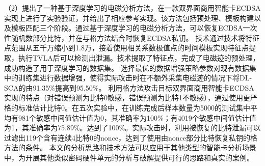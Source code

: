 {	
	（2）提出了一种基于深度学习的电磁分析方法，在一款双界面商用智能卡ECDSA实现上进行了实验验证，并给出了相应参考实现。该方法包括预处理、模板构建以及模板匹配三个阶段。通过基于深度学习的电磁分析方法，可以恢复ECDSA一次性随机数部分比特，并在与格方法结合时恢复ECDSA私钥。
	\yuchuli 技术通过\poifanwei 技术将特征点范围从五千万缩小到1.8万，接着使用相关系数极值点的时间模板实现特征点提取，执行TVLA后可以检测出泄漏。\yuchuli 技术提取了特征点，完成了电磁迹的预处理，成功构造了用于深度学习的数据集。
	\shujuzengqiang 选择最优的数据增强策略参数对现有数据集中的训练集进行数据增强，使得实际攻击时在不额外采集电磁迹的情况下将DL-SCA的\zyx 由91.35\%提高到95.50\%。
	\jiashejianyanguji 利用格方法攻击目标双界面商用智能卡ECDSA实现的特点（对错误预测为比特0敏感，错误预测为比特1不敏感），通过使用更严格的标准估计比特0。在五次实验中，在训练完成后样本数量为5000的测试集中平均有981个敏感中间值估计值为0，其准确率为100\%；有4019个敏感中间值估计值为1，其准确率为75.89\%。\zyx 达到了100\%。实际攻击时，利用被恢复的比特泄漏可以过滤出119个含有连续4比特0的nonce，达到了使用由nonce部分比特恢复私钥的格方法的条件。
	本文的分析思路和技术方法可以应用于其他类型的智能卡分析场景中，为开展其他类似密码硬件单元的分析与破解提供可行的思路和真实的案例。
	
	
}
